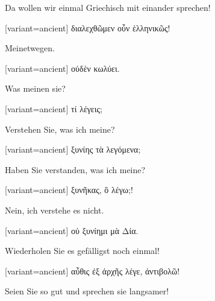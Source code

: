 Da wollen wir einmal Griechisch mit einander sprechen!

\switchcolumn

\begin{greek}[variant=ancient]%
διαλεχθῶμεν οὖν ἑλληνικῶς!

\end{greek}%
\switchcolumn*

Meinetwegen.

\switchcolumn

\begin{greek}[variant=ancient]%
οὐδὲν κωλύει.

\end{greek}%
\switchcolumn*

Was meinen sie?

\switchcolumn

\begin{greek}[variant=ancient]%
τί λέγεις;

\end{greek}%
\switchcolumn*

Verstehen Sie, was ich meine?

\switchcolumn

\begin{greek}[variant=ancient]%
ξυνίης τὰ λεγόμενα;

\end{greek}%
\switchcolumn*

Haben Sie verstanden, was ich meine?

\switchcolumn

\begin{greek}[variant=ancient]%
ξυνῆκας, ὃ λέγω;!

\end{greek}%
\switchcolumn*

Nein, ich verstehe es nicht.

\switchcolumn

\begin{greek}[variant=ancient]%
οὐ ξυνίημι μὰ Δία.

\end{greek}%
\switchcolumn*

Wiederholen Sie es gefälligst noch einmal!

\switchcolumn

\begin{greek}[variant=ancient]%
αὖθις ἐξ ἀρχῆς λέγε, ἀντιβολῶ!

\end{greek}%
\switchcolumn*

Seien Sie so gut und sprechen sie langsamer!

